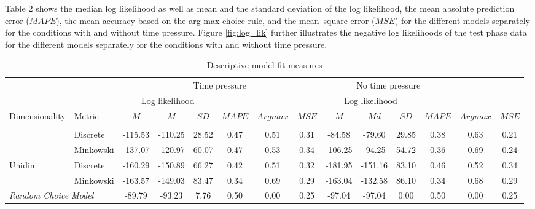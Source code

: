 \documentclass[a4paper,man,natbib]{apa6}
\begin{document}
Table 2 shows the median log likelihood as well as mean and the standard deviation of the log likelihood, the mean absolute prediction error ($MAPE$), the mean accuracy based on the arg max choice rule, and the mean--square error ($MSE$) for the different models separately for the conditions with and without time pressure. Figure \ref{fig:log_lik} further illustrates the negative log likelihoods of the test phase data for the different models separately for the conditions with and without time pressure.

\begin{table}
\begin{center}
\begin{threeparttable}
\caption{Descriptive model fit measures}
\label{tab:fitmeasures}
\begin{tabular}{llcccccccccccc}
\toprule
 &  & \multicolumn{6}{c}{Time pressure} & \multicolumn{4}{c}{No time pressure}\\
\cmidrule(r){3-8} \cmidrule(r){9-14}
 &  & \multicolumn{3}{c}{Log likelihood} & & & & \multicolumn{3}{c}{Log likelihood} & & & \\
\cmidrule(r){3-5} \cmidrule(r){9-11}
Dimensionality & \multicolumn{1}{l}{Metric} & \multicolumn{1}{c}{$M$} & \multicolumn{1}{c}{$M$} & \multicolumn{1}{c}{$SD$} & \multicolumn{1}{c}{$MAPE$} & \multicolumn{1}{c}{$Arg max$} & \multicolumn{1}{c}{$MSE$} & \multicolumn{1}{c}{$M$} & \multicolumn{1}{c}{$Md$} & \multicolumn{1}{c}{$SD$} & \multicolumn{1}{c}{$MAPE$} & \multicolumn{1}{c}{$Arg max$} & \multicolumn{1}{c}{$MSE$}\\
\midrule
\addlinespace
\multicolumn{2}{l}{\emph{Generalized Context Model}} \\
\addlinespace
\multirow{2}{*}{Multidim} & Discrete & -115.53 & -110.25 & 28.52 & 0.47 & 0.51 & 0.31 & -84.58 & -79.60 & 29.85 & 0.38 & 0.63 & 0.21\\
\cmidrule(r){2-14}
 & Minkowski & -137.07 & -120.97 & 60.07 & 0.47 & 0.53 & 0.34 & -106.25 & -94.25 & 54.72 & 0.36 & 0.69 & 0.24\\
\cmidrule(r){1-14}
\multirow{2}{*}{Unidim} & Discrete & -160.29 & -150.89 & 66.27 & 0.42 & 0.51 & 0.32 & -181.95 & -151.16 & 83.10 & 0.46 & 0.52 & 0.34\\
\cmidrule(r){2-14}
 & Minkowski & -163.57 & -149.03 & 83.47 & 0.34 & 0.69 & 0.29 & -163.04 & -132.58 & 86.10 & 0.34 & 0.68 & 0.29\\
\cmidrule(r){1-14}
\multicolumn{2}{l}{\emph{Random Choice Model}} & -89.79 & -93.23 & 7.76 & 0.50 & 0.00 & 0.25 & -97.04 & -97.04 & 0.00 & 0.50 & 0.00 & 0.25\\

\end{tabular}
\end{threeparttable}
\end{center}
\end{table}
\end{document}
